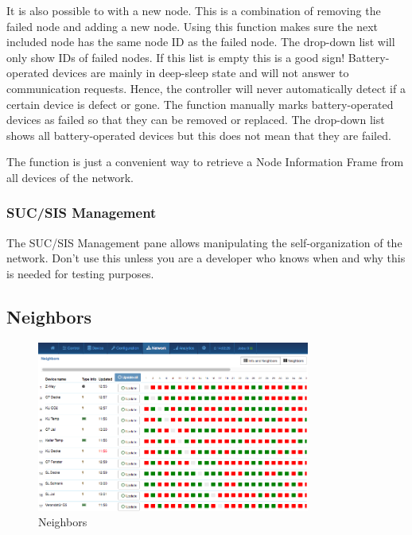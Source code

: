 It is also possible to  with a new node. This is a combination 
of removing the failed node and adding a new node. Using this function makes sure the next 
included node has the same node ID as the failed node. The drop-down list will only show 
IDs of failed nodes. If this list is empty this is a good sign! Battery-operated devices 
are mainly in deep-sleep state and will not answer to communication requests. Hence, the 
controller will never automatically detect if a certain device is defect or gone. The 
function  manually marks battery-operated devices as 
failed so that they can be removed or replaced. The drop-down list shows all battery-operated 
devices but this does not mean that they are failed.

The  function is just a convenient way to retrieve a Node 
Information Frame from all devices of the network.

\subsubsection{SUC/SIS Management}

The SUC/SIS Management pane allows manipulating the self-organization of the \zwave network. 
Don’t use this unless you are a developer who knows when and why this is needed for testing purposes.

\subsection{Neighbors}

\begin{figure}
\begin{center}
\includegraphics[width=0.8\textwidth]{pngs/cap7/eui22.png}
\caption{Neighbors}
\label{eui22}
\end{center}
\end{figure}

